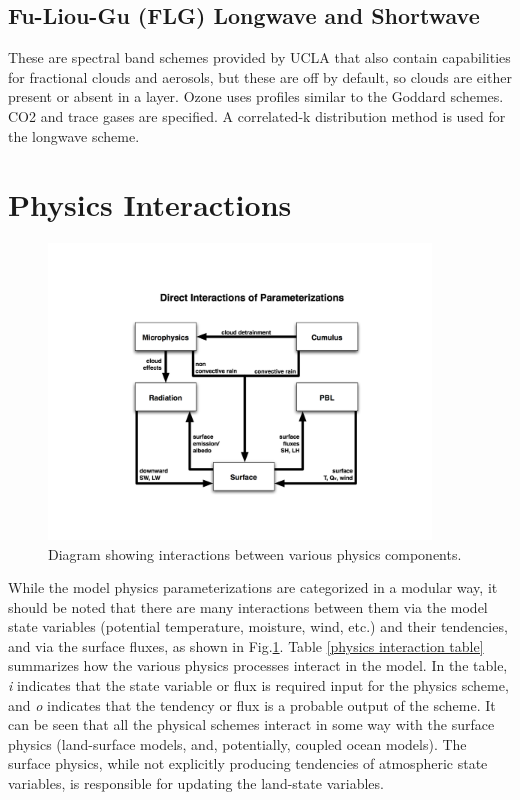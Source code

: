 \subsection {Fu-Liou-Gu (FLG) Longwave and Shortwave}

These are spectral band schemes provided by UCLA  \citep{gu11,fu92}
that also contain capabilities for fractional clouds and aerosols, but these are off by default,
so clouds are either present or absent in a layer. Ozone uses profiles similar to the
Goddard schemes. CO2 and trace gases are specified.
A correlated-k distribution method is used for the longwave scheme.

\section {Physics Interactions}

%
%
\begin{figure}
 \centering
  \includegraphics[width=4.0in]{figures/physics.pdf}
  \caption{\label{figure:physics}Diagram showing interactions between
   various physics components.}
\end{figure}

While the model physics parameterizations are categorized in a modular way,
it should be noted that there are many interactions between them via the
model state variables (potential temperature, moisture, wind, etc.)
and their tendencies, and via the surface fluxes, as shown in Fig.\ref{figure:physics}.
Table \ref {physics interaction table} summarizes how the various physics
processes interact in the model. In the table, {\em i} indicates that the 
state variable or flux is required input for the physics scheme, and {\em o}
indicates that the tendency or flux is a probable output of the scheme.
It can be seen that all the physical schemes interact in some way with the surface
physics (land-surface models, and, potentially, coupled ocean models).
The surface physics, while not explicitly producing tendencies of atmospheric
state variables, is responsible for updating the land-state variables.

